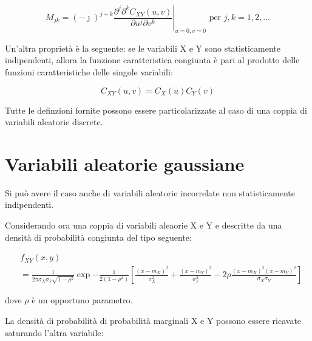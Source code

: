 {
    \Large
    \begin{equation}
        M_{jk} 
        = 
        (-\jmath)^{j + k}
        \left. 
            \frac{\partial ^{j} \partial ^{k} C_{XY} (u, v)}
            {\partial u ^{j} \partial v ^{k}}
        \right|_{u = 0, v=0}
        \text{ per }
        j, k = 1,2,...
    \end{equation}
}


Un'altra proprietà è la seguente: se le variabili X e Y sono statisticamente indipendenti, 
allora la funzione caratteristica congiunta è pari al prodotto delle funzioni caratteristiche 
delle singole variabili: 

{
    \Large 
    \begin{equation}
        C_{XY} (u, v) = C_X (u) C_Y (v)
    \end{equation}
}

Tutte le definzioni fornite possono essere particolarizzate al caso di una coppia di variabili aleatorie discrete. \newline 

\newpage 

\section{Variabili aleatorie gaussiane} 

Si può avere il caso anche di variabili aleatorie incorrelate non statisticamente indipendenti. \newline 

Considerando ora una coppia di variabili aleaorie X e Y e descritte da una densità di probabilità congiunta del tipo seguente: 

{
    \normalsize 
    \begin{equation}
        \begin{split}
            &f_{XY} (x, y)
            \\
            &= 
            \frac{1}{2 \pi \sigma_X \sigma_Y \sqrt{1 - \rho^{2}}}
            \exp{-\frac{1}{2(1 - \rho^{2})} 
            [\frac{(x-m_X)^{2}}{\sigma_X ^{2}}
            +
            \frac{(x-m_Y)^{2}}{\sigma_Y ^{2}}
            -2 \rho 
            \frac{(x-m_X)^{2} (x-m_Y)^{2}}{\sigma_X \sigma_Y}]}    
        \end{split}
    \end{equation}
}

dove $\rho$  è un opportuno parametro. \newline 

La densità di probabilità di probabilità marginali X e Y possono essere ricavate saturando l'altra variabile: 


